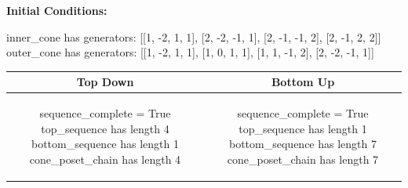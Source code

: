 \documentclass[10pt]{article}
\begin{document}
\textbf{Initial Conditions:}
\begin{SAGE}
inner_cone has generators: 
[[1, -2, 1, 1], [2, -2, -1, 1], [2, -1, -1, 2], [2, -1, 2, 2]]
outer_cone has generators: 
[[1, -2, 1, 1], [1, 0, 1, 1], [1, 1, -1, 2], [2, -2, -1, 1]]

\end{SAGE}
\begin{tabular}{c|c}
\textbf{Top Down} & \textbf{Bottom Up} \\ \hline  
\begin{SAGE}
sequence_complete = True
top_sequence has length 4
bottom_sequence has length 1
cone_poset_chain has length 4
\end{SAGE} 
&
\begin{SAGE}
sequence_complete = True
top_sequence has length 1
bottom_sequence has length 7
cone_poset_chain has length 7
\end{SAGE} 
\\ \hline


\end{tabular}
\end{document}
